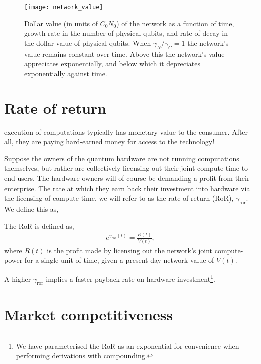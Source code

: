 \begin{figure}[!htbp]
	\texttt{[image: network\_value]}
	\captionspacefig \caption{Dollar value (in units of \mbox{$C_0N_0$}) of the network as a function of time, growth rate in the number of physical qubits, and rate of decay in the dollar value of physical qubits. When \mbox{$\gamma_N/\gamma_C=1$} the network's value remains constant over time. Above this the network's value appreciates exponentially, and below which it depreciates exponentially against time.} \label{fig:network_value}
\end{figure}

%
%

\section{Rate of return}

 execution of computations typically has monetary value to the consumer. After all, they are paying hard-earned money for access to the technology!

Suppose the owners of the quantum hardware are not running computations themselves, but rather are collectively licensing out their joint compute-time to end-users. The hardware owners will of course be demanding a profit from their enterprise. The rate at which they earn back their investment into hardware via the licensing of compute-time, we will refer to as the rate of return (RoR), $\gamma_\mathrm{ror}$. We define this as,

\begin{postulate}\label{post:RoR}
The RoR is defined as,
\begin{align}
e^{\gamma_\mathrm{ror}(t)} = \frac{R(t)}{V(t)},
\end{align}
where $R(t)$ is the profit made by licensing out the network's joint compute-power for a single unit of time, given a present-day network value of $V(t)$.
\end{postulate}

A higher $\gamma_\mathrm{ror}$ implies a faster payback rate on hardware investment\footnote{We have parameterised the RoR as an exponential for convenience when performing derivations with compounding.}.

%
%

\section{Market competitiveness}

